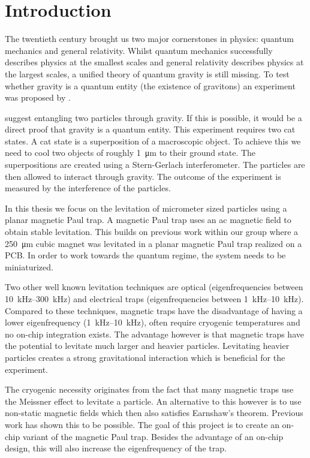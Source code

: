 \chapter{Introduction}
\label{chap:introduction}
The twentieth century brought us two major cornerstones in physics: quantum mechanics and general relativity. Whilst quantum mechanics successfully describes physics at the smallest scales and general relativity describes physics at the largest scales, a unified theory of quantum gravity is still missing. To test whether gravity is a quantum entity (the existence of gravitons) an experiment was proposed by \textcite{bose_spin_2017}.

\citeauthor{bose_spin_2017} suggest entangling two particles through gravity\cite{bose_spin_2017}. If this is possible, it would be a direct proof that gravity is a quantum entity. This experiment requires two cat states. A cat state is a superposition of a macroscopic object. To achieve this we need to cool two objects of roughly \qty{1}{\micro\meter} to their ground state. The superpositions are created using a Stern-Gerlach interferometer. The particles are then allowed to interact through gravity. The outcome of the experiment is measured by the interference of the particles.

In this thesis we focus on the levitation of micrometer sized particles using a planar magnetic Paul trap. A magnetic Paul trap uses an ac magnetic field to obtain stable levitation. This builds on previous work within our group where a \qty{250}{\micro\meter} cubic  magnet was levitated in a planar magnetic Paul trap realized on a PCB\cite{eli, mart}. In order to work towards the quantum regime, the system needs to be miniaturized.

Two other well known levitation techniques are optical (eigenfrequencies between \qtyrange{10}{300}{\kilo\hertz}) and electrical traps (eigenfrequencies between \qtyrange{1}{10}{\kilo\hertz})\cite{levitodynamics}. Compared to these techniques, magnetic traps have the disadvantage of having a lower eigenfrequency (\qtyrange{1}{10}{\kilo\hertz}), often require cryogenic temperatures and no on-chip integration exists\cite{levitodynamics}. The advantage however is that magnetic traps have the potential to levitate much larger and heavier particles. Levitating heavier particles creates a strong gravitational interaction which is beneficial for the experiment.

The cryogenic necessity originates from the fact that many magnetic traps use the Meissner effect to levitate a particle. An alternative to this however is to use non-static magnetic fields which then also satisfies Earnshaw's theorem. Previous work has shown this to be possible\cite{perdriat,eli,mart}. The goal of this project is to create an on-chip variant of the magnetic Paul trap. Besides the advantage of an on-chip design, this will also increase the eigenfrequency of the trap\cite{perdriat}.
